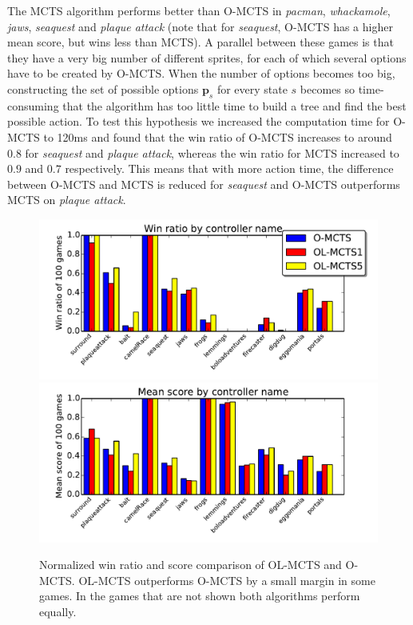 The MCTS algorithm performs better than O-MCTS in \textit{pacman},
\textit{whackamole}, \textit{jaws}, \textit{seaquest} and \textit{plaque attack}
(note that for \textit{seaquest}, O-MCTS has a higher mean score, but wins less
than MCTS). A parallel between these games is that they have a very
big number of different sprites, for each of which several options have to be
created by O-MCTS\@. When the number of options becomes too big, constructing the
set of possible options $\mathbf{p}_s$ for every state $s$ becomes so
time-consuming that the algorithm has too little time to build a tree and find
the best possible action. To test this hypothesis we increased the computation
time for O-MCTS to 120ms and found that the win ratio of O-MCTS increases to
around $0.8$ for \textit{seaquest} and \textit{plaque attack}, whereas the win
ratio for MCTS increased to $0.9$ and $0.7$ respectively. This means that with
more action time, the difference between O-MCTS and MCTS is reduced for
\textit{seaquest} and O-MCTS outperforms MCTS on \textit{plaque attack}.

\begin{figure}
	\centering
	\includegraphics[width=\columnwidth]{includes/winsOLMCTS}
	\centering
	\includegraphics[width=\columnwidth]{includes/scoresOLMCTS}
	\vspace{-.8cm}
	\caption{Normalized win ratio and score comparison of OL-MCTS and O-MCTS\@.
	OL-MCTS outperforms O-MCTS by a small margin in some games. In the games
	that are not shown both algorithms perform equally.}
	\label{fig:scores-olmcts}
\end{figure}

